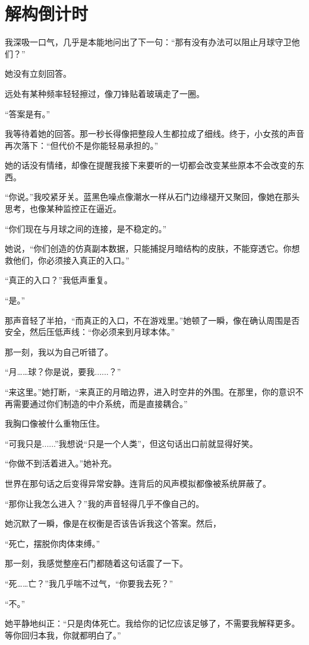 \chapter{解构倒计时}

我深吸一口气，几乎是本能地问出了下一句：“那有没有办法可以阻止月球守卫他们？”

她没有立刻回答。

远处有某种频率轻轻擦过，像刀锋贴着玻璃走了一圈。

“答案是有。”

我等待着她的回答。那一秒长得像把整段人生都拉成了细线。终于，小女孩的声音再次落下：“但代价不是你能轻易承担的。”

她的话没有情绪，却像在提醒我接下来要听的一切都会改变某些原本不会改变的东西。

“你说。”我咬紧牙关。蓝黑色噪点像潮水一样从石门边缘褪开又聚回，像她在那头思考，也像某种监控正在逼近。

“你们现在与月球之间的连接，是不稳定的。”

她说，“你们创造的仿真副本数据，只能捕捉月暗结构的皮肤，不能穿透它。你想救他们，你必须接入真正的入口。”

“真正的入口？”我低声重复。

“是。”

那声音轻了半拍，“而真正的入口，不在游戏里。”她顿了一瞬，像在确认周围是否安全，然后压低声线：“你必须来到月球本体。”

那一刻，我以为自己听错了。

“月……球？你是说，要我......？”

“来这里。”她打断，“来真正的月暗边界，进入时空井的外围。在那里，你的意识不再需要通过你们制造的中介系统，而是直接耦合。”

我胸口像被什么重物压住。

“可我只是......”我想说“只是一个人类”，但这句话出口前就显得好笑。

“你做不到活着进入。”她补充。

世界在那句话之后变得异常安静。连背后的风声模拟都像被系统屏蔽了。

“那你让我怎么进入？”我的声音轻得几乎不像自己的。

她沉默了一瞬，像是在权衡是否该告诉我这个答案。然后，

“死亡，摆脱你肉体束缚。”

那一刻，我感觉整座石门都随着这句话震了一下。

“死……亡？”我几乎喘不过气，“你要我去死？”

“不。”

她平静地纠正：“只是肉体死亡。我给你的记忆应该足够了，不需要我解释更多。等你回归本我，你就都明白了。”

